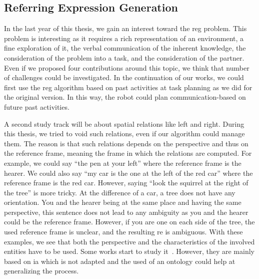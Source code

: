 \subsection*{Referring Expression Generation}

In the last year of this thesis, we gain an interest toward the \acrfull{reg} problem. This problem is interesting as it requires a rich representation of an environment, a fine exploration of it, the verbal communication of the inherent knowledge, the consideration of the problem into a task, and the consideration of the partner. Even if we proposed four contributions around this topic, we think that number of challenges could be investigated. In the continuation of our works, we could first use the \acrshort{reg} algorithm based on past activities at task planning as we did for the original version. In this way, the robot could plan communication-based on future past activities.

A second study track will be about spatial relations like left and right. During this thesis, we tried to void such relations, even if our algorithm could manage them. The reason is that such relations depends on the perspective and thus on the reference frame, meaning the frame in which the relations are computed. For example, we could say ``the pen at your left'' where the reference frame is the hearer. We could also say ``my car is the one at the left of the red car'' where the reference frame is the red car. However, saying ``look the squirrel at the right of the tree'' is more tricky. At the difference of a car, a tree does not have any orientation. You and the hearer being at the same place and having the same perspective, this sentence does not lead to any ambiguity as you and the hearer could be the reference frame. However, if you are one on each side of the tree, the used reference frame is unclear, and the resulting \acrshort{re} is ambiguous. With these examples, we see that both the perspective and the characteristics of the involved entities have to be used. Some works start to study it~\cite{kelleher_2006_incremental, dos_2015_generating}. However, they are mainly based on \acrlong{ia} which is not adapted and the used of an ontology could help at generalizing the process.

